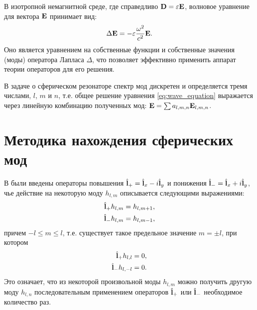 \documentclass[12pt,a4paper]{article}
\begin{document}
        В изотропной немагнитной среде, где справедливо $\mathbf{D} = \varepsilon \mathbf{E}$, волновое уравнение для вектора $\mathbf{E}$ принимает вид:
        \begin{equation}\label{eq:wave_equation}
            \Delta \mathbf{E} = - \varepsilon \frac{\omega^2}{c^2} \mathbf{E} .
        \end{equation}
        Оно является уравнением на собственные функции и собственные значения (моды) оператора Лапласа $\Delta$, что позволяет эффективно применить аппарат теории операторов для его решения.

        В задаче о сферическом резонаторе спектр мод дискретен и определяется тремя числами, $l$, $m$ и $n$, т.е. общее решение уравнения \autoref{eq:wave_equation} выражается через линейную комбинацию полученных мод: $\mathbf{E} = \sum a_{l,m,n} \mathbf{E}_{l,m,n}$.


    \section{Методика нахождения сферических мод}

        В \cite{math_appendix} были введены операторы повышения $\hat{\mathbf{l}}_{+} = \hat{\mathbf{l}}_x - i \hat{\mathbf{l}}_y$ и понижения $\hat{\mathbf{l}}_{-} = \hat{\mathbf{l}}_x + i \hat{\mathbf{l}}_y$, чье действие на некоторую моду $h_{l, m}$ описывается следующими выражениями:
        \begin{equation}\begin{aligned}
            \hat{\mathbf{l}}_{+} h_{l, m} &= h_{l, m+1} , \\
            \hat{\mathbf{l}}_{-} h_{l, m} &= h_{l, m-1} ,
        \end{aligned}\end{equation}
        причем $- l \le m \le l$, т.е. существует такое предельное значение $m = \pm l$, при котором
        \begin{equation}\begin{aligned}
            \hat{\mathbf{l}}_{+} h_{l, l}   &= 0 , \\
            \hat{\mathbf{l}}_{-} h_{l, - l} &= 0 .
        \end{aligned}\end{equation}
        Это означает, что из некоторой произвольной моды $h_{l, m}$ можно получить другую моду $h_{l, n}$ последовательным применением операторов $\hat{\mathbf{l}}_{+}$ или $\hat{\mathbf{l}}_{-}$ необходимое количество раз.
\end{document}
